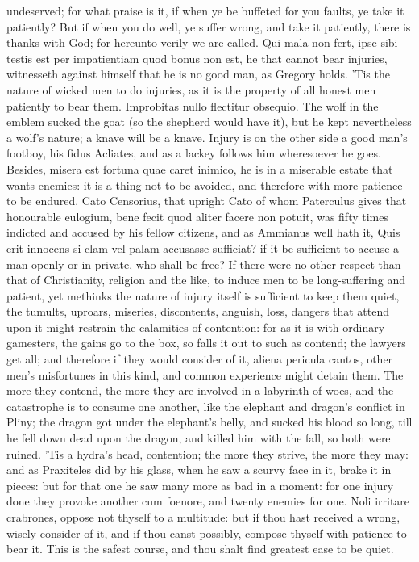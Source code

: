 {undeserved; for what praise is it, if when ye be buffeted for you
faults, ye take it patiently? But if when you do well, ye suffer wrong,
and take it patiently, there is thanks with God; for hereunto verily we
are called. Qui mala non fert, ipse sibi testis est per impatientiam
quod bonus non est, he that cannot bear injuries, witnesseth against
himself that he is no good man, as Gregory holds. 'Tis the nature
of wicked men to do injuries, as it is the property of all honest men
patiently to bear them. Improbitas nullo flectitur obsequio. The wolf
in the emblem sucked the goat (so the shepherd would have it),
but he kept nevertheless a wolf's nature; a knave will be a
knave. Injury is on the other side a good man's footboy, his fidus
Acliates, and as a lackey follows him wheresoever he goes. Besides,
misera est fortuna quae caret inimico, he is in a miserable estate that
wants enemies: it is a thing not to be avoided, and therefore
with more patience to be endured. Cato Censorius, that upright Cato of
whom Paterculus gives that honourable eulogium, bene fecit quod aliter
facere non potuit, was fifty times indicted and accused by his
fellow citizens, and as Ammianus well hath it, Quis erit innocens
si clam vel palam accusasse sufficiat? if it be sufficient to accuse a
man openly or in private, who shall be free? If there were no other
respect than that of Christianity, religion and the like, to induce men
to be long-suffering and patient, yet methinks the nature of injury
itself is sufficient to keep them quiet, the tumults, uproars,
miseries, discontents, anguish, loss, dangers that attend upon it might
restrain the calamities of contention: for as it is with ordinary
gamesters, the gains go to the box, so falls it out to such as contend;
the lawyers get all; and therefore if they would consider of it, aliena
pericula cantos, other men's misfortunes in this kind, and common
experience might detain them. The more they contend, the more
they are involved in a labyrinth of woes, and the catastrophe is to
consume one another, like the elephant and dragon's conflict in Pliny;
the dragon got under the elephant's belly, and sucked his blood
so long, till he fell down dead upon the dragon, and killed him with
the fall, so both were ruined. 'Tis a hydra's head, contention; the
more they strive, the more they may: and as Praxiteles did by his
glass, when he saw a scurvy face in it, brake it in pieces: but for
that one he saw many more as bad in a moment: for one injury done they
provoke another cum foenore, and twenty enemies for one. Noli irritare
crabrones, oppose not thyself to a multitude: but if thou hast received
a wrong, wisely consider of it, and if thou canst possibly, compose
thyself with patience to bear it. This is the safest course, and thou
shalt find greatest ease to be quiet.

}
